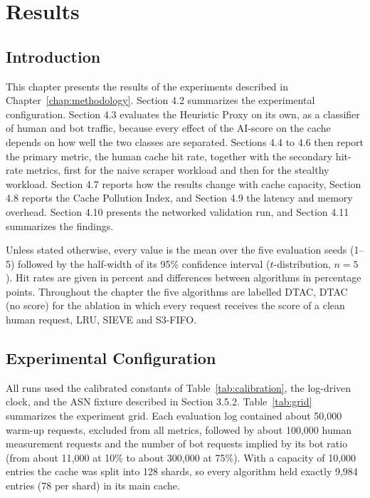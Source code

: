 \chapter{Results}
\label{chap:results}

\section{Introduction}
This chapter presents the results of the experiments described in Chapter~\ref{chap:methodology}. Section 4.2 summarizes the experimental configuration. Section 4.3 evaluates the Heuristic Proxy on its own, as a classifier of human and bot traffic, because every effect of the AI-score on the cache depends on how well the two classes are separated. Sections 4.4 to 4.6 then report the primary metric, the human cache hit rate, together with the secondary hit-rate metrics, first for the naive scraper workload and then for the stealthy workload. Section 4.7 reports how the results change with cache capacity, Section 4.8 reports the Cache Pollution Index, and Section 4.9 the latency and memory overhead. Section 4.10 presents the networked validation run, and Section 4.11 summarizes the findings.

Unless stated otherwise, every value is the mean over the five evaluation seeds (1--5) followed by the half-width of its 95\% confidence interval ($t$-distribution, $n = 5$). Hit rates are given in percent and differences between algorithms in percentage points. Throughout the chapter the five algorithms are labelled DTAC, DTAC (no score) for the ablation in which every request receives the score of a clean human request, LRU, SIEVE and S3-FIFO.

\section{Experimental Configuration}
All runs used the calibrated constants of Table~\ref{tab:calibration}, the log-driven clock, and the ASN fixture described in Section 3.5.2. Table~\ref{tab:grid} summarizes the experiment grid. Each evaluation log contained about 50{,}000 warm-up requests, excluded from all metrics, followed by about 100{,}000 human measurement requests and the number of bot requests implied by its bot ratio (from about 11{,}000 at 10\% to about 300{,}000 at 75\%). With a capacity of 10{,}000 entries the cache was split into 128 shards, so every algorithm held exactly 9{,}984 entries (78 per shard) in its main cache.

